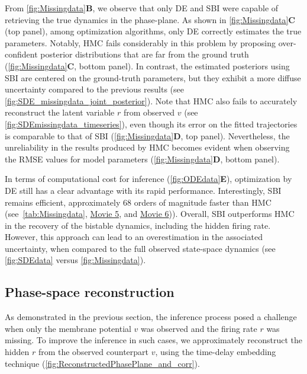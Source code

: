 \documentclass[preprint,11pt,authoryear]{elsarticle}
\begin{document}
From \autoref{fig:Missingdata}\textbf{B}, we observe that only DE and SBI were capable of retrieving the true dynamics in the phase-plane. As shown in \autoref{fig:Missingdata}\textbf{C} (top panel), among optimization algorithms, only DE correctly estimates the true parameters. Notably, HMC fails considerably in this problem by proposing over-confident posterior distributions that are far from the ground truth (\autoref{fig:Missingdata}\textbf{C}, bottom panel). In contrast, the estimated posteriors using SBI are centered on the ground-truth parameters, but they exhibit a more diffuse uncertainty compared to the previous results (see \autoref{fig:SDE_missingdata_joint_posterior}).
Note that HMC also fails to accurately reconstruct the latent variable $r$ from observed $v$ (see \autoref{fig:SDEmissingdata_timeseries}), even though its error on the fitted trajectories is comparable to that of SBI (\autoref{fig:Missingdata}\textbf{D}, top panel). Nevertheless, the unreliability in the results produced by HMC becomes evident when observing the RMSE values for model parameters (\autoref{fig:Missingdata}\textbf{D}, bottom panel). 

In terms of computational cost for inference (\autoref{fig:ODEdata}\textbf{E}), optimization by DE still has a clear advantage with its rapid performance.
Interestingly, SBI remains efficient, approximately 68 orders of magnitude faster than HMC (see~\autoref{tab:Missingdata},  \href{run:./Videos/Movie5_MPR_SDE_HMC_V.mp4}{Movie 5}, and  \href{run:./Videos/Movie6_MPR_SDE_SBI_V.mp4}{Movie 6})). Overall, SBI outperforms HMC in the recovery of the bistable dynamics, including the hidden firing rate.  However, this approach can lead to an overestimation in the associated uncertainty, when compared to the full observed state-space dynamics (see \autoref{fig:SDEdata} versus \autoref{fig:Missingdata}).



\subsection{Phase-space reconstruction}

As demonstrated in the previous section, the inference process posed a challenge when only the membrane potential $v$ was observed and the firing rate $r$ was missing. To improve the inference in such cases, we approximately reconstruct the hidden $r$ from the observed counterpart $v$, using the time-delay embedding technique (\autoref{fig:ReconstructedPhasePlane_and_corr}). 
\end{document}
